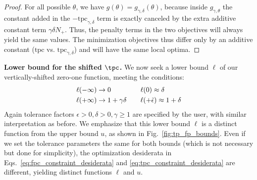 \begin{proof}
For all possible $\theta$, we have $g(\theta) = g_{\gamma, \delta}(\theta)$, because inside $g_{\gamma, \theta}$ the constant added in the $-\text{tpc}_{\gamma, \delta}$ term is exactly canceled by the extra additive constant term $\gamma \delta N_+$. Thus, the penalty terms in the two objectives will always yield the same values. The minimization objectives thus differ only by an additive constant ($\text{tpc}$ vs. $\text{tpc}_{\gamma,\delta}$) and will have the same local optima.
\end{proof}


\textbf{Lower bound for the shifted $\tpc$.}
We now seek a lower bound $\ell$ of our vertically-shifted zero-one function, meeting the conditions:
\begin{align}
	\ell(-\infty)   &\rightarrow 0
\quad && 
	\ell(0) \approx \delta
\label{eq:tpc_constraint_desiderata}
\\ \notag
	\ell(+\infty) &\rightarrow 1 + \gamma \delta
\quad &&
	\ell(+\tilde{\epsilon}) \approx 1 + \delta
\end{align}
Again tolerance factors $\epsilon > 0, \delta > 0, \gamma \geq 1$ are specified by the user, with similar interpretation as before. 
We emphasize that this lower bound $\ell$ is a distinct function from the upper bound $u$, as shown in Fig.~\ref{fig:tp_fp_bounds}.
Even if we set the tolerance parameters the same for both bounds (which is not necessary but done for simplicity), the optimization desiderata in Eqs.~\eqref{eq:fpc_constraint_desiderata} and \eqref{eq:tpc_constraint_desiderata} are different, yielding distinct functions $\ell$ and $u$.

